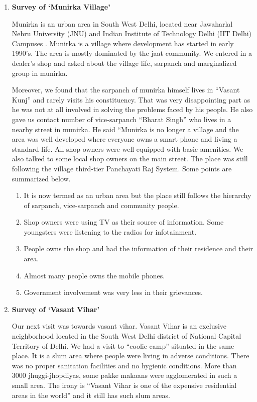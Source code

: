 \begin{enumerate}
\item \textbf {Survey of ‘Munirka Village’}

Munirka is an urban area in South West Delhi, located near Jawaharlal Nehru
University (JNU) and Indian Institute of Technology Delhi (IIT Delhi)
Campuses \cite{Munir91:online}. Munirka is a village where development has started in early 1990’s.
The area is mostly dominated by the jaat community. We entered in a dealer’s shop
and asked about the village life, sarpanch and marginalized group in munirka.

Moreover, we found that the sarpanch of munirka himself lives in “Vasant Kunj”
and rarely visits his constituency. That was very disappointing part as he was not
at all involved in solving the problems faced by his people. He also gave us contact
number of vice-sarpanch “Bharat Singh” who lives in a nearby street in munirka.
He said “Munirka is no longer a village and the area was well developed where
everyone owns a smart phone and living a standard life. All shop owners were well
equipped with basic amenities. We also talked to some local shop owners on the
main street. The place was still following the village third-tier Panchayati Raj
System. Some points are summarized below.

\begin{enumerate}
\item It is now termed as an urban area but the place still follows the hierarchy of
sarpanch, vice-sarpanch and community people.
\item Shop owners were using TV as their source of information. Some youngsters
were listening to the radios for infotainment.
\item People owns the shop and had the information of their residence and their
area.
\item Almost many people owns the mobile phones.
\item Government involvement was very less in their grievances.
\end{enumerate}

\item \textbf {Survey of ‘Vasant Vihar’}

Our next visit was towards vasant vihar. Vasant Vihar is an exclusive
neighborhood located in the South West Delhi district of National Capital Territory
of Delhi. We had a visit to “coolie camp” situated in the same place. It is a slum area
where people were living in adverse conditions. There was no proper sanitation
facilities and no hygienic conditions. More than 3000 jhuggi-jhopdiyas, some pakke
makaans were agglomerated in such a small area. The irony is “Vasant Vihar is one
of the expensive residential areas in the world”  and it
still has such slum areas.\\


\end{enumerate}
